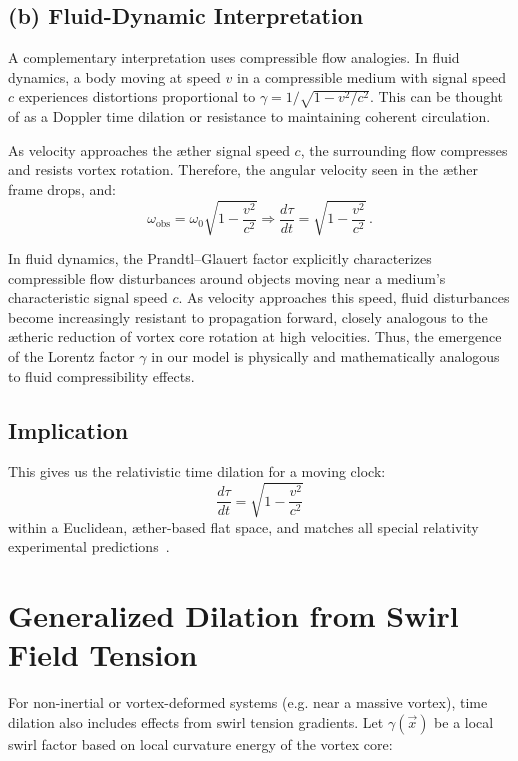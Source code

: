 \documentclass[a4paper,12pt]{article}
\begin{document}
\subsection*{(b) Fluid-Dynamic Interpretation}

A complementary interpretation uses compressible flow analogies. In fluid dynamics, a body moving at speed $v$ in a compressible medium with signal speed $c$ experiences distortions proportional to $\gamma = 1/\sqrt{1 - v^2/c^2}$. This can be thought of as a Doppler time dilation or resistance to maintaining coherent circulation. 

As velocity approaches the æther signal speed $c$, the surrounding flow compresses and resists vortex rotation. Therefore, the angular velocity seen in the æther frame drops, and:
\begin{equation}
\omega_\text{obs} = \omega_0 \sqrt{1 - \frac{v^2}{c^2}} \Rightarrow \frac{d\tau}{dt} = \sqrt{1 - \frac{v^2}{c^2}} \,.
\end{equation}

In fluid dynamics, the Prandtl–Glauert factor explicitly characterizes compressible flow disturbances around objects moving near a medium's characteristic signal speed $c$. As velocity approaches this speed, fluid disturbances become increasingly resistant to propagation forward, closely analogous to the ætheric reduction of vortex core rotation at high velocities. Thus, the emergence of the Lorentz factor $\gamma$ in our model is physically and mathematically analogous to fluid compressibility effects.

\subsection*{Implication}

This gives us the relativistic time dilation for a moving clock:
\[
\boxed{\frac{d\tau}{dt} = \sqrt{1 - \frac{v^2}{c^2}}}
\]
within a Euclidean, æther-based flat space, and matches all special relativity experimental predictions~\cite{Rado2020-æther-Lorentz, Levy2009-æther-clock}.

\section*{Generalized Dilation from Swirl Field Tension}\label{sec:generalized_dilation}

For non-inertial or vortex-deformed systems (e.g. near a massive vortex), time dilation also includes effects from swirl tension gradients. Let $\gamma(\vec{x})$ be a local swirl factor based on local curvature energy of the vortex core:
\end{document}
